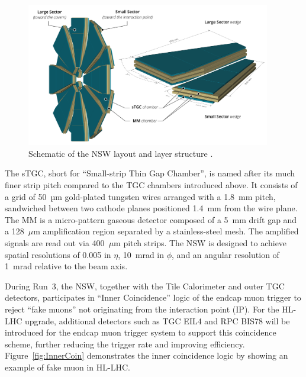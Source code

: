 \begin{figure}[htbp]
  \centering
  \includegraphics[width=0.95\textwidth]{figs/chapter2/NSW.png}
  \caption{Schematic of the NSW layout and layer structure \cite{ATLASRun3Detector}.}
  \label{fig:NSW}
\end{figure}

The sTGC, short for ``Small-strip Thin Gap Chamber'', is named after its much finer strip pitch compared to the TGC chambers introduced above. It consists of a grid of 50~µm gold-plated tungsten wires arranged with a 1.8~mm pitch, sandwiched between two cathode planes positioned 1.4~mm from the wire plane. The MM is a micro-pattern gaseous detector composed of a 5~mm drift gap and a 128~$\mu$m amplification region separated by a stainless-steel mesh. The amplified signals are read out via 400~$\mu$m pitch strips. The NSW is designed to achieve spatial resolutions of 0.005 in $\eta$, 10~mrad in $\phi$, and an angular resolution of 1~mrad relative to the beam axis.

During Run~3, the NSW, together with the Tile Calorimeter and outer TGC detectors, participates in ``Inner Coincidence'' logic of the endcap muon trigger to reject ``fake muons'' not originating from the interaction point (IP). For the HL-LHC upgrade, additional detectors such as TGC EIL4 and RPC BIS78 will be introduced for the endcap muon trigger system to support this coincidence scheme, further reducing the trigger rate and improving efficiency. Figure~\ref{fig:InnerCoin} demonstrates the inner coincidence logic by showing an example of fake muon in HL-LHC.

